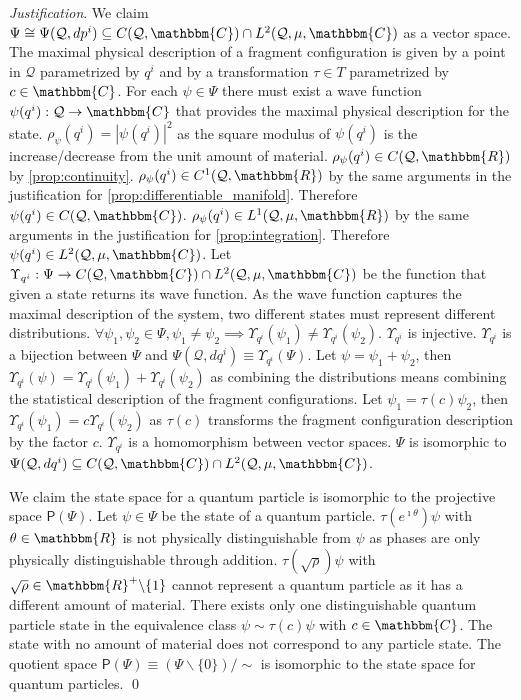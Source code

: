 \documentclass[aps,pra,10pt,twocolumn,floatfix,nofootinbib]{revtex4-1}
\numberwithin{equation}{section}
\theoremstyle{definition}
\newenvironment{justification}{\emph{Justification}.}{\qed}
\begin{document}
\begin{justification}
	We claim $\Psi \cong \Psi(\mathcal{Q}, dp^i) \subseteq C(\mathcal{Q}, \mathbbm{C}) \cap L^2(\mathcal{Q}, \mu, \mathbbm{C})$ as a vector space. The maximal physical description of a fragment configuration is given by a point in $\mathcal{Q}$ parametrized by $q^i$ and by a transformation $\tau \in T$ parametrized by $c \in \mathbbm{C}$. For each $\psi \in \Psi$ there must exist a wave function $\psi(q^i) : \mathcal{Q} \rightarrow \mathbbm{C}$ that provides the maximal physical description for the state. $\rho_\psi(q^i) = |\psi(q^i)|^2$ as the square modulus of $\psi(q^i)$ is the increase/decrease from the unit amount of material. $\rho_\psi(q^i) \in C(\mathcal{Q}, \mathbbm{R})$ by \ref{prop:continuity}. $\rho_\psi(q^i) \in C^1(\mathcal{Q}, \mathbbm{R})$ by the same arguments in the justification for \ref{prop:differentiable_manifold}. Therefore $\psi(q^i) \in C(\mathcal{Q}, \mathbbm{C})$. $\rho_\psi(q^i) \in L^1(\mathcal{Q}, \mu, \mathbbm{R})$ by the same arguments in the justification for \ref{prop:integration}. Therefore $\psi(q^i) \in L^2(\mathcal{Q}, \mu, \mathbbm{C})$. Let $\Upsilon_{q^i} : \Psi \rightarrow C(\mathcal{Q}, \mathbbm{C}) \cap L^2(\mathcal{Q}, \mu, \mathbbm{C})$ be the function that given a state returns its wave function. As the wave function captures the maximal description of the system, two different states must represent different distributions. $\forall \psi_1, \psi_2 \in \Psi, \psi_1 \neq \psi_2 \implies \Upsilon_{q^i}(\psi_1) \neq \Upsilon_{q^i}(\psi_2)$. $\Upsilon_{q^i}$ is injective. $\Upsilon_{q^i}$ is a bijection between $\Psi$ and $\Psi(\mathcal{Q}, dq^i)\equiv\Upsilon_{q^i}(\Psi)$. Let $\psi=\psi_1+\psi_2$, then $\Upsilon_{q^i}(\psi)=\Upsilon_{q^i}(\psi_1)+\Upsilon_{q^i}(\psi_2)$ as combining the distributions means combining the statistical description of the fragment configurations. Let $\psi_1=\tau(c)\psi_2$, then $\Upsilon_{q^i}(\psi_1)=c \Upsilon_{q^i}(\psi_2)$ as $\tau(c)$ transforms the fragment configuration description by the factor $c$. $\Upsilon_{q^i}$ is a homomorphism between vector spaces. $\Psi$ is isomorphic to $\Psi(\mathcal{Q}, dq^i) \subseteq C(\mathcal{Q}, \mathbbm{C}) \cap L^2(\mathcal{Q}, \mu, \mathbbm{C})$.
	
	We claim the state space for a quantum particle is isomorphic to the projective space $\mathsf{P}(\Psi)$. Let $\psi \in \Psi$ be the state of a quantum particle. $\tau(e^{\imath \theta}) \psi$ with $\theta \in \mathbbm{R}$ is not physically distinguishable from $\psi$ as phases are only physically distinguishable through addition. $\tau(\sqrt{\rho}) \psi$ with $\sqrt{\rho} \in \mathbbm{R}^+ \backslash \{1\}$ cannot represent a quantum particle as it has a different amount of material. There exists only one distinguishable quantum particle state in the equivalence class $\psi \sim \tau(c) \psi$ with $c \in \mathbbm{C}$. The state with no amount of material does not correspond to any particle state. The quotient space $\mathsf{P}(\Psi) \equiv (\Psi \backslash \{0\}) / \sim$ is isomorphic to the state space for quantum particles.
\end{justification}
\end{document}
